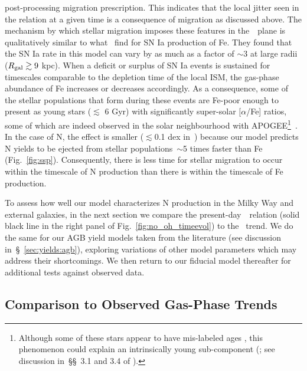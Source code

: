 \documentclass[ms.tex]{subfiles}
\begin{document}
post-processing migration prescription.
This indicates that the local jitter seen in the relation at a given time is
a consequence of migration as discussed above.
The mechanism by which stellar migration imposes these features in
the~\ohno~plane is qualitatively similar to what~\citet{Johnson2021} find for
SN Ia production of Fe.
They found that the SN Ia rate in this model can vary by as much as a factor of
$\sim$3 at large radii ($R_\text{gal} \gtrsim 9$ kpc).
When a deficit or surplus of SN Ia events is sustained for timescales
comparable to the depletion time of the local ISM, the gas-phase abundance of
Fe increases or decreases accordingly.
As a consequence, some of the stellar populations that form during these
events are Fe-poor enough to present as young stars ($\lesssim$ 6 Gyr) with
significantly super-solar [$\alpha$/Fe] ratios, some of which are indeed
observed in the solar neighbourhood with APOGEE\footnote{
	Although some of these stars appear to have mis-labeled ages
	\citep{Jofre2016, Yong2016, Izzard2018, SilvaAguirre2018, Miglio2021}, this
	phenomenon could explain an intrinsically young sub-component
	(\citealp{Hekker2019}; see discussion in~\S\S~3.1 and 3.4 of
	\citealp{Johnson2021}).
}~\citep{Chiappini2015, Martig2015, Martig2016, Warfield2021}.
In the case of N, the effect is smaller ($\lesssim$0.1 dex in~\no) because our
model predicts N yields to be ejected from stellar populations~$\sim$5
times faster than Fe (Fig.~\ref{fig:ssp}).
Consequently, there is less time for stellar migration to occur within the
timescale of N production than there is within the timescale of Fe production.
\par
To assess how well our model characterizes N production in the Milky Way and
external galaxies, in the next section we compare the
present-day~\ohno~relation (solid black line in the right panel of
Fig.~\ref{fig:no_oh_timeevol}) to the~\citet{Dopita2016} trend.
We do the same for our AGB yield models taken from the literature
(see discussion in~\S~\ref{sec:yields:agb}), exploring variations of other
model parameters which may address their shortcomings.
We then return to our fiducial model thereafter for additional tests against
observed data.


\subsection{Comparison to Observed Gas-Phase Trends}
\label{sec:results:yields}
\end{document}
